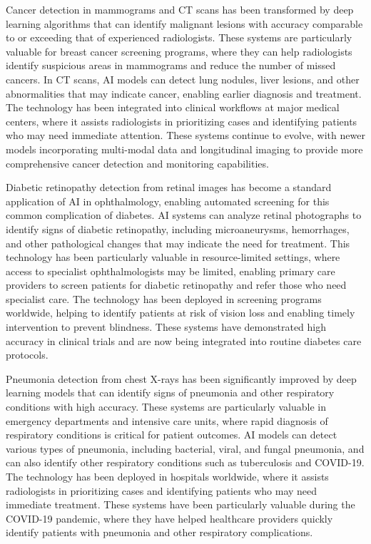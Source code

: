 Cancer detection in mammograms and CT scans has been transformed by deep learning algorithms that can identify malignant lesions with accuracy comparable to or exceeding that of experienced radiologists. These systems are particularly valuable for breast cancer screening programs, where they can help radiologists identify suspicious areas in mammograms and reduce the number of missed cancers. In CT scans, AI models can detect lung nodules, liver lesions, and other abnormalities that may indicate cancer, enabling earlier diagnosis and treatment. The technology has been integrated into clinical workflows at major medical centers, where it assists radiologists in prioritizing cases and identifying patients who may need immediate attention. These systems continue to evolve, with newer models incorporating multi-modal data and longitudinal imaging to provide more comprehensive cancer detection and monitoring capabilities.

Diabetic retinopathy detection from retinal images has become a standard application of AI in ophthalmology, enabling automated screening for this common complication of diabetes. AI systems can analyze retinal photographs to identify signs of diabetic retinopathy, including microaneurysms, hemorrhages, and other pathological changes that may indicate the need for treatment. This technology has been particularly valuable in resource-limited settings, where access to specialist ophthalmologists may be limited, enabling primary care providers to screen patients for diabetic retinopathy and refer those who need specialist care. The technology has been deployed in screening programs worldwide, helping to identify patients at risk of vision loss and enabling timely intervention to prevent blindness. These systems have demonstrated high accuracy in clinical trials and are now being integrated into routine diabetes care protocols.

Pneumonia detection from chest X-rays has been significantly improved by deep learning models that can identify signs of pneumonia and other respiratory conditions with high accuracy. These systems are particularly valuable in emergency departments and intensive care units, where rapid diagnosis of respiratory conditions is critical for patient outcomes. AI models can detect various types of pneumonia, including bacterial, viral, and fungal pneumonia, and can also identify other respiratory conditions such as tuberculosis and COVID-19. The technology has been deployed in hospitals worldwide, where it assists radiologists in prioritizing cases and identifying patients who may need immediate treatment. These systems have been particularly valuable during the COVID-19 pandemic, where they have helped healthcare providers quickly identify patients with pneumonia and other respiratory complications.

